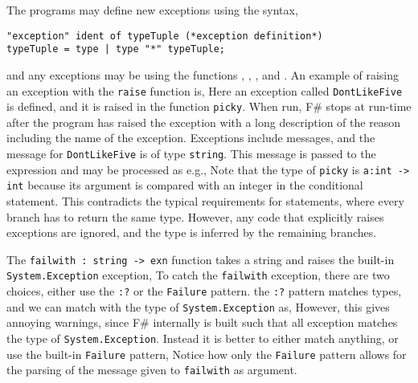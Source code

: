 The programs may define new exceptions using the syntax,
%
\begin{lstlisting}[language=ebnf]
"exception" ident of typeTuple (*exception definition*)
typeTuple = type | type "*" typeTuple;
\end{lstlisting}
and any exceptions may be  using the functions , , , and . An example of raising an exception with the \lstinline!raise! function is,
%
%
Here an exception called \lstinline!DontLikeFive! is defined, and it is raised in the function \lstinline!picky!. When run, F\# stops at run-time after the program has raised the exception with a long description of the reason including the name of the exception. Exceptions include messages, and the message for \lstinline!DontLikeFive! is of type \lstinline!string!. This message is passed to the  expression and may be processed as e.g., 
%
%
Note that the type of \lstinline!picky! is \lstinline!a:int -> int! because its argument is compared with an integer in the conditional statement. This contradicts the typical requirements for  statements, where every branch has to return the same type. However, any code that explicitly raises exceptions are ignored, and the type is inferred by the remaining branches.

The \lstinline!failwith : string -> exn! function takes a string and raises the built-in \lstinline!System.Exception! exception, 
%
%
To catch the \lstinline!failwith! exception, there are two choices, either use the \lstinline!:?! or the \lstinline!Failure! pattern. the \lstinline!:?! pattern matches types, and we can match with the type of \lstinline!System.Exception! as,
%
%
However, this gives annoying warnings, since F\# internally is built such that all exception matches the type of \lstinline!System.Exception!. Instead it is better to either match anything,
%
%
or use the built-in \lstinline!Failure! pattern,
%
%
Notice how only the \lstinline!Failure! pattern allows for the parsing of the message given to \lstinline!failwith! as argument.

